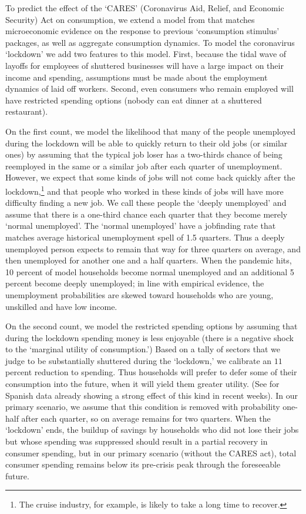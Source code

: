 \documentclass[titlepage]{\econtex}
\begin{document}
To predict the effect of the `CARES' (Coronavirus Aid, Relief, and Economic Security) Act on consumption, we extend a model from \cite{carroll_sticky_2020} that matches microeconomic evidence on the response to previous `consumption stimulus' packages, as well as aggregate consumption dynamics.
To model the coronavirus `lockdown' we add two features to this model. First, because the tidal wave of layoffs for employees of shuttered businesses will have a large impact on their income and spending, assumptions must be made about the employment dynamics of laid off workers.
Second, even consumers who remain employed will have restricted spending options (nobody can eat dinner at a shuttered restaurant).

On the first count, we model the likelihood that many of the people unemployed during the lockdown will be able to quickly return to their old jobs (or similar ones) by assuming that the typical job loser has a two-thirds chance of being reemployed in the same or a similar job after each quarter of unemployment.  However, we expect that some kinds of jobs will not come back quickly after the lockdown,\footnote{The cruise industry, for example, is likely to take a long time to recover.} and that people who worked in these kinds of jobs will have more difficulty finding a new job.  We call these people the `deeply unemployed' and assume that there is a one-third chance each quarter that they become merely `normal unemployed'.  The `normal unemployed' have a jobfinding rate that matches average historical unemployment spell of 1.5 quarters.  Thus a deeply unemployed person expects to remain that way for three quarters on average, and then unemployed for another one and a half quarters.  When the pandemic hits, 10 percent of model households become normal unemployed and an additional 5 percent become deeply unemployed; in line with empirical evidence, the unemployment probabilities are skewed toward households who are young, unskilled and have low income.

On the second count, we model the restricted spending options by assuming that during the lockdown spending money is less enjoyable (there is a negative shock to the `marginal utility of consumption.')
Based on a tally of sectors that we judge to be substantially shuttered during the `lockdown,' we calibrate an $11$ percent reduction to spending.
Thus households will prefer to defer some of their consumption into the future, when it will yield them greater utility. (See \cite{SpanishSpending} for Spanish data already showing a strong effect of this kind in recent weeks).
In our primary scenario, we assume that this condition is removed with probability one-half after each quarter, so on average remains for two quarters.  When the `lockdown' ends, the buildup of savings by households who did not lose their jobs but whose spending was suppressed should result in a partial recovery in consumer spending, but in our primary scenario (without the CARES act), total consumer spending remains below its pre-crisis peak through the foreseeable future.  
\end{document}
